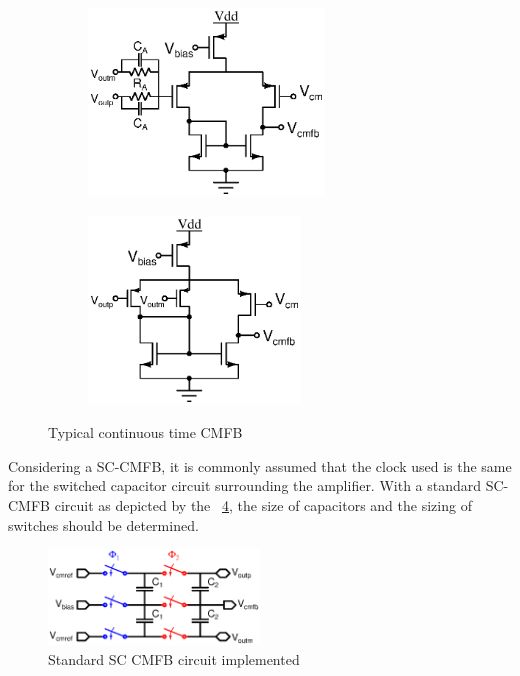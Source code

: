 \begin{figure}[htp]
    \centering
    \begin{subfigure}[b]{0.48\textwidth}
        \includegraphics[height=5cm]{Chapter7/Figs/resistive_sensing_cmfb.ps}
        \label{fig:res_sens_cmfb}
    \end{subfigure}
    \begin{subfigure}[b]{0.48\textwidth}
        \includegraphics[height=5cm]{Chapter7/Figs/schematic_dda_cmfb.ps}
        \label{fig:dda_cmfb}
    \end{subfigure}
    \caption{Typical continuous time CMFB}
    \label{fig:shunt_inverter_sensing}
\end{figure}

Considering a SC-CMFB, it is commonly assumed that the clock used is the same for the switched capacitor circuit surrounding the amplifier. With a standard SC-CMFB circuit as depicted by the \figurename~\ref{fig:sc-cmfb}, the size of capacitors and the sizing of switches should be determined.

\begin{figure}[htp]
    \centering
    \includegraphics[width=0.5\textwidth]{Chapter7/Figs/sc-cmfb.ps}
    \caption{Standard SC CMFB circuit implemented}
    \label{fig:sc-cmfb}
\end{figure}

